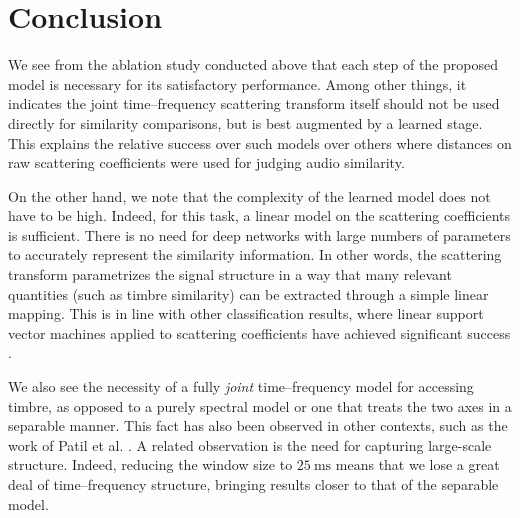 \documentclass{bmcart}
\newcommand{\nmu}{}
\begin{document}


\section*{\nmu Conclusion}
\label{sec:conclusion}

We see from the ablation study conducted above that each step of the proposed model is necessary for its satisfactory performance.
Among other things, it indicates the joint time--frequency scattering transform itself should not be used directly for similarity comparisons, but is best augmented by a learned stage.
This explains the relative success over such models \cite{lostanlen2018jasmp,lostanlen2018extended} over others where distances on raw scattering coefficients were used for judging audio similarity.

On the other hand, we note that the complexity of the learned model does not have to be high.
Indeed, for this task, a linear model on the scattering coefficients is sufficient.
There is no need for deep networks with large numbers of parameters to accurately represent the similarity information.
In other words, the scattering transform parametrizes the signal structure in a way that many relevant quantities (such as timbre similarity) can be extracted through a simple linear mapping.
This is in line with other classification results, where linear support vector machines applied to scattering coefficients have achieved significant success \cite{anden2015mlsp,anden2019tsp}.

We also see the necessity of a fully \emph{joint} time--frequency model for accessing timbre, as opposed to a purely spectral model or one that treats the two axes in a separable manner.
This fact has also been observed in other contexts, such as the work of Patil et al. \cite{patil2012ploscompbiol}.
A related observation is the need for capturing large-scale structure.
Indeed, reducing the window size to $25~\mathrm{ms}$ means that we lose a great deal of time--frequency structure, bringing results closer to that of the separable model.
\end{document}

